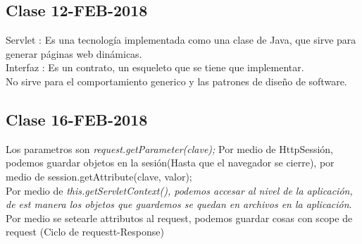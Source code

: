 \documentclass{article}
\begin{document}
\subsection{Clase 12-FEB-2018}
Servlet : Es una tecnología implementada como una clase de Java, que sirve para generar páginas web dinámicas.\\
Interfaz :  Es un contrato, un esqueleto que se tiene que implementar.\\
No sirve para el comportamiento generico y las patrones de diseño de software.\\
\subsection{Clase 16-FEB-2018}
Los parametros son \textit{request.getParameter(clave);}
Por medio de HttpSessión, podemos guardar objetos en la sesión(Hasta que el navegador se cierre), por medio de session.getAttribute(clave, valor);\\
Por medio de \textit{this.getServletContext(), podemos accesar al nivel de la aplicación, de est manera los objetos que guardemos se quedan en archivos en la aplicación}.\\
Por medio se setearle attributos al request, podemos guardar cosas con scope de request (Ciclo de requestt-Response)
\end{document}
